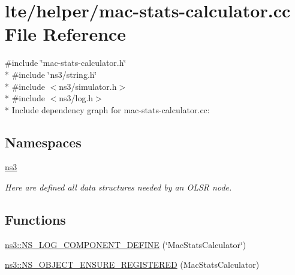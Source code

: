 \hypertarget{mac-stats-calculator_8cc}{}\section{lte/helper/mac-\/stats-\/calculator.cc File Reference}
\label{mac-stats-calculator_8cc}
{\ttfamily \#include \char`\"{}mac-\/stats-\/calculator.\+h\char`\"{}}\\*
{\ttfamily \#include \char`\"{}ns3/string.\+h\char`\"{}}\\*
{\ttfamily \#include $<$ns3/simulator.\+h$>$}\\*
{\ttfamily \#include $<$ns3/log.\+h$>$}\\*
Include dependency graph for mac-\/stats-\/calculator.cc\+:
\subsection*{Namespaces}
\begin{DoxyCompactItemize}
\item 
 \hyperlink{namespacens3}{ns3}
\begin{DoxyCompactList}\small\item\em Here are defined all data structures needed by an O\+L\+SR node. \end{DoxyCompactList}\end{DoxyCompactItemize}
\subsection*{Functions}
\begin{DoxyCompactItemize}
\item 
\hyperlink{namespacens3_a3570b2443476cef3f1e1ee4836aee853}{ns3\+::\+N\+S\+\_\+\+L\+O\+G\+\_\+\+C\+O\+M\+P\+O\+N\+E\+N\+T\+\_\+\+D\+E\+F\+I\+NE} (\char`\"{}Mac\+Stats\+Calculator\char`\"{})
\item 
\hyperlink{namespacens3_ad81b48720a3e2442636ede3defb54d40}{ns3\+::\+N\+S\+\_\+\+O\+B\+J\+E\+C\+T\+\_\+\+E\+N\+S\+U\+R\+E\+\_\+\+R\+E\+G\+I\+S\+T\+E\+R\+ED} (Mac\+Stats\+Calculator)
\end{DoxyCompactItemize}

